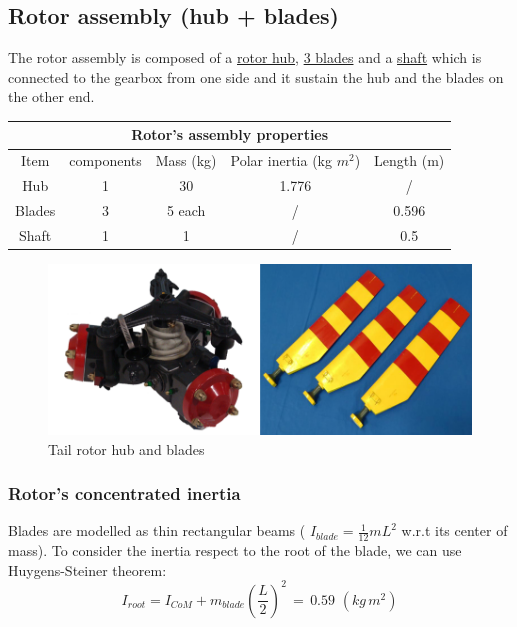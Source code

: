 \bigskip
\subsection*{Rotor assembly (hub + blades)}
\noindent
The rotor assembly is composed of a \underline{rotor hub}, \underline{3 blades} and a \underline{shaft} which is connected to the gearbox from one side and it sustain the hub and the blades on the other end. 

\medskip
\begin{table}[h!]
	\centering
	
	\begin{tabular}{c c c c c} 
		\toprule
		\multicolumn{5}{c}{Rotor's assembly properties}\\
		\midrule
		Item & components & Mass (kg) & Polar inertia (kg $m^2$) & Length (m) \\
		\midrule
		Hub & 1 & 30  &  1.776  & / \\ 
		\midrule
		Blades & 3 & 5 each  & / & 0.596 \\
		\midrule
		Shaft & 1 & 1  &  /  & 0.5 \\
		
		\bottomrule
	\end{tabular}	
\end{table}


\smallskip
\begin{figure}[h!]
	\begin{center}
		\centering  		 		
		\includegraphics[width=0.9\linewidth]{PICTURES/2_Lama_truss/PNG/model2/hubeblades}
	\end{center}
	\caption{Tail rotor hub and blades}
\end{figure}	

\subsubsection*{Rotor's concentrated inertia}
\noindent
Blades are modelled as thin rectangular beams ( $I_{blade} = \frac{1}{12} m L^2 $ w.r.t its center of mass).
To consider the inertia respect to the root of the blade, we can use Huygens-Steiner theorem:
\begin{equation*}
I_{root} = I_{CoM} + m_{blade}  \left( \frac{L}{2} \right) ^2  \, = \, 0.59 \, \, (kg \, m^2)
\end{equation*}

